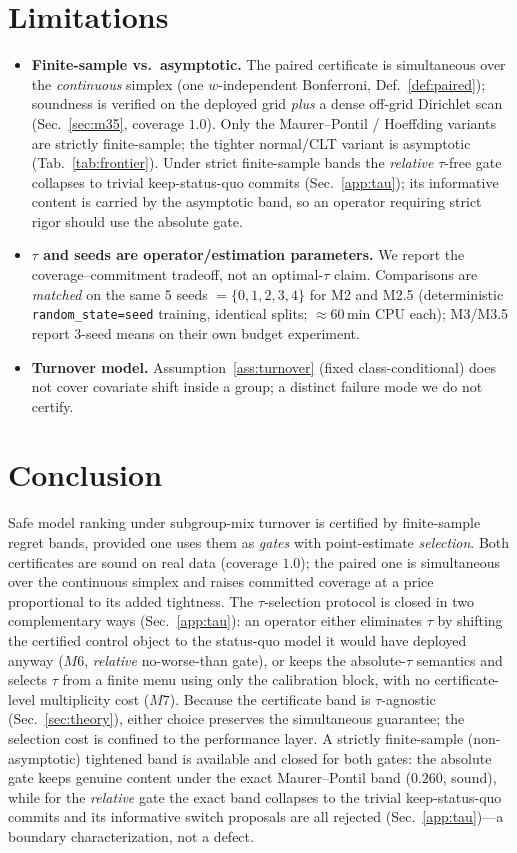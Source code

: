 \documentclass{article}
\begin{document}
\section{Limitations}
\label{sec:limits}
\begin{itemize}
\item \textbf{Finite-sample vs.\ asymptotic.} The paired certificate is simultaneous over the
\emph{continuous} simplex (one $w$-independent Bonferroni, Def.~\ref{def:paired}); soundness
is verified on the deployed grid \emph{plus} a dense off-grid Dirichlet scan (Sec.~\ref{sec:m35},
coverage $1.0$). Only the Maurer--Pontil / Hoeffding variants are strictly finite-sample; the
tighter normal/CLT variant is asymptotic (Tab.~\ref{tab:frontier}). Under strict finite-sample
bands the \emph{relative} $\tau$-free gate collapses to trivial keep-status-quo commits
(Sec.~\ref{app:tau}); its informative content is carried by the asymptotic band, so an
operator requiring strict rigor should use the absolute gate.
\item \textbf{$\tau$ and seeds are operator/estimation parameters.} We report the
coverage--commitment tradeoff, not an optimal-$\tau$ claim. Comparisons are \emph{matched} on
the same $5$ seeds $=\allowbreak\{0,1,2,3,4\}$ for M2 and M2.5 (deterministic
\texttt{random\_state=seed} training, identical splits; $\approx$60\,min CPU each);
M3/M3.5 report $3$-seed means on their own budget experiment.
\item \textbf{Turnover model.} Assumption~\ref{ass:turnover} (fixed class-conditional) does
not cover covariate shift inside a group; a distinct failure mode we do not certify.
\end{itemize}

\section{Conclusion}
\label{sec:concl}
Safe model ranking under subgroup-mix turnover is certified by finite-sample regret bands,
provided one uses them as \emph{gates} with point-estimate \emph{selection}. Both certificates
are sound on real data (coverage $1.0$); the paired one is simultaneous over the continuous
simplex and raises committed coverage at a price proportional to its added tightness.
The $\tau$-selection protocol is closed in two complementary ways (Sec.~\ref{app:tau}):
an operator either eliminates $\tau$ by shifting the certified control object to the
status-quo model it would have deployed anyway ($M6$, \emph{relative} no-worse-than gate),
or keeps the absolute-$\tau$ semantics and selects $\tau$ from a finite menu using only the
calibration block, with no certificate-level multiplicity cost ($M7$). Because the
certificate band is $\tau$-agnostic (Sec.~\ref{sec:theory}), either choice preserves the
simultaneous guarantee; the selection cost is confined to the performance layer. A
strictly finite-sample (non-asymptotic) tightened band is available and closed for both
gates: the absolute gate keeps genuine content under the exact Maurer--Pontil band
($0.260$, sound), while for the \emph{relative} gate the exact band collapses to the
trivial keep-status-quo commits and its informative switch proposals are all rejected
(Sec.~\ref{app:tau})---a boundary characterization, not a defect.
\end{document}
